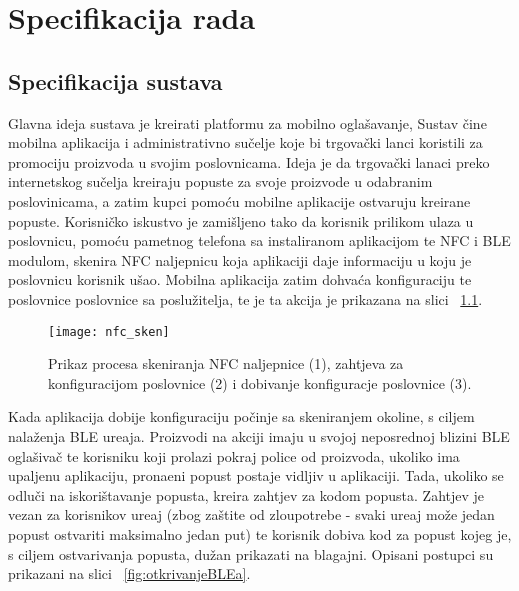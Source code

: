 \chapter{Specifikacija rada}


\section{Specifikacija sustava}

Glavna ideja sustava je kreirati platformu za mobilno ogla\v{s}avanje, Sustav \v{c}ine mobilna aplikacija i administrativno su\v{c}elje koje bi trgova\v{c}ki lanci koristili za promociju proizvoda u svojim poslovnicama. Ideja je da trgova\v{c}ki lanaci preko internetskog su\v{c}elja kreiraju popuste za svoje proizvode u odabranim poslovinicama, a zatim kupci pomo\'{c}u mobilne aplikacije ostvaruju kreirane popuste. Korisni\v{c}ko iskustvo je zami\v{s}ljeno tako da korisnik prilikom ulaza u poslovnicu, pomo\'{c}u pametnog telefona sa instaliranom aplikacijom te NFC i BLE modulom, skenira NFC naljepnicu koja aplikaciji daje informaciju u koju je poslovnicu korisnik u\v{s}ao. Mobilna aplikacija zatim dohva\'{c}a konfiguraciju te poslovnice poslovnice sa poslu\v{z}itelja, te je ta akcija je prikazana na slici ~\ref{fig:skeniranjeNaljepnice}.

\begin{figure}[!htbp]
	\begin{center}
 \texttt{[image: nfc\_sken]}
 \caption{Prikaz procesa skeniranja NFC naljepnice (1), zahtjeva za konfiguracijom poslovnice (2) i dobivanje konfiguracje poslovnice (3).}
 \label{fig:skeniranjeNaljepnice}
	\end{center}
\end{figure}

Kada aplikacija dobije konfiguraciju po\v{c}inje sa skeniranjem okoline, s ciljem nala\v{z}enja BLE ure\dj aja. Proizvodi na akciji imaju u svojoj neposrednoj blizini BLE ogla\v{s}iva\v{c} te korisniku koji prolazi pokraj police od proizvoda, ukoliko ima upaljenu aplikaciju, prona\dj eni popust postaje vidljiv u aplikaciji. Tada, ukoliko se odlu\v{c}i na iskori\v{s}tavanje popusta, kreira zahtjev za kodom popusta. Zahtjev je vezan za korisnikov ure\dj aj (zbog za\v{s}tite od zloupotrebe - svaki ure\dj aj mo\v{z}e jedan popust ostvariti maksimalno jedan put) te korisnik dobiva kod za popust kojeg je, s ciljem ostvarivanja popusta, du\v{z}an prikazati na blagajni. Opisani postupci su prikazani na slici  ~\ref{fig:otkrivanjeBLEa}.

